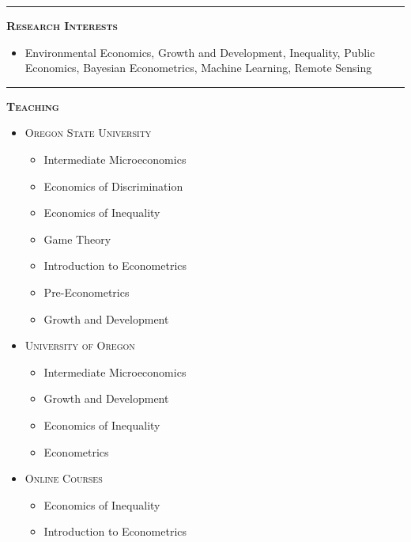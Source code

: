 \documentclass[12pt]{article}
\begin{document}
\hrule
\bigskip 
\noindent \textsc{\large \textbf{Research Interests}}

\begin{itemize}
\item[] Environmental Economics, Growth and Development, Inequality, Public Economics, Bayesian Econometrics, Machine Learning, Remote Sensing 
\end{itemize}




\bigskip
\hrule
\bigskip 
\noindent \textsc{\large \textbf{Teaching}}

\begin{itemize}
\item[] \textsc{Oregon State University}
\begin{itemize}[topsep=-1em, noitemsep]
\item[] Intermediate Microeconomics%
\item[] Economics of Discrimination%
\item[] Economics of Inequality%
\item[] Game Theory%
\item[] Introduction to Econometrics%
\item[] Pre-Econometrics%
\item[] Growth and Development
\end{itemize}

\newpage

\item[] \textsc{University of Oregon}
\begin{itemize}[topsep=-1em, noitemsep]
\item[] Intermediate Microeconomics%
\item[] Growth and Development%
\item[] Economics of Inequality%
\item[] Econometrics%
\end{itemize}

\item[] \textsc{Online Courses} 
\begin{itemize}[topsep=-1em, noitemsep]
\item[] Economics of Inequality%
\item[] Introduction to Econometrics%
\end{itemize}
\end{itemize}
\end{document}
